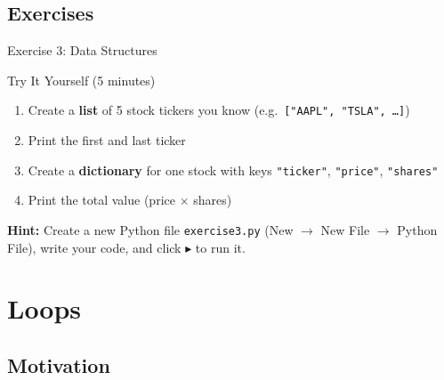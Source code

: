 \documentclass[9pt,aspectratio=169]{beamer}
\begin{document}
\subsection{Exercises}
\begin{frame}[fragile]{Exercise 3: Data Structures}

\begin{alertblock}{Try It Yourself (5 minutes)}
\begin{enumerate}
    \item Create a \textbf{list} of 5 stock tickers you know (e.g.\ \texttt{["AAPL", "TSLA", \ldots]})
    \item Print the first and last ticker
    \item Create a \textbf{dictionary} for one stock with keys \texttt{"ticker"}, \texttt{"price"}, \texttt{"shares"}
    \item Print the total value (price $\times$ shares)
\end{enumerate}
\end{alertblock}

\medskip

\textbf{Hint:} Create a new Python file \texttt{exercise3.py} (New $\to$ New File $\to$ Python File), write your code, and click $\blacktriangleright$ to run it.

\end{frame}


\section{Loops}
\subsection{Motivation}
\end{document}

